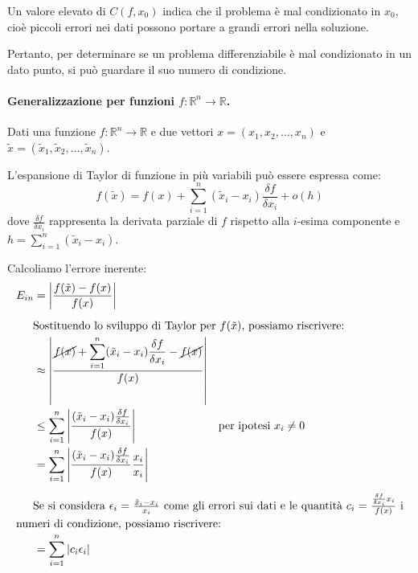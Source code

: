 \documentclass{article}
\numberwithin{equation}{section}
\newcommand{\alignedintertext}[1]{%
  \noalign{%
    \vskip\belowdisplayshortskip
    \vtop{\hsize=\linewidth#1\par
    \expandafter}%
    \expandafter\prevdepth\the\prevdepth
  }%
}
\begin{document}
Un valore elevato di $C(f, x_0)$ indica che il problema è mal condizionato in
$x_0$, cioè piccoli errori nei dati possono portare a grandi errori nella
soluzione.

Pertanto, per determinare se un problema differenziabile è mal condizionato in
un dato punto, si può guardare il suo numero di condizione.

\paragraph{Generalizzazione per funzioni $f:\mathbb{R}^n\rightarrow
\mathbb{R}$.} Dati una funzione $f:\mathbb{R}^n\rightarrow \mathbb{R}$ e due
vettori $x=(x_1,x_2,\ldots,x_n)$ e 
$\tilde{x}=(\tilde{x}_1,\tilde{x}_2,\ldots,\tilde{x}_n)$. 

L'espansione di
Taylor di funzione in più variabili può essere espressa come:
$$f(\tilde{x})=f(x)+\displaystyle\sum_{i=1}^{n}(\tilde{x}_i-x_i)\frac{\delta
f}{\delta x_i}+o(h)$$
dove $\frac{\delta f}{\delta x_i}$ rappresenta la derivata parziale di $f$
rispetto alla $i$-esima componente e
$h=\displaystyle\sum_{i=1}^{n}(\tilde{x}_i-x_i)$.

Calcoliamo l'errore inerente:
\begin{equation*}
   \begin{aligned}
       E_{in}&=\left\lvert \frac{f(\tilde{x})-f(x)}{f(x)}\right\rvert\\
       \alignedintertext{Sostituendo lo sviluppo di Taylor per $f(\tilde{x})$,
       possiamo riscrivere:}
             &\approx \left\lvert
                 \frac{\cancel{f(x)}+\displaystyle\sum_{i=1}^{n}(\tilde{x}_i-x_i)\frac{\delta
             f}{\delta x_i}-\cancel{f(x)}}{f(x)}\right\rvert \\ 
             &\leq \displaystyle\sum_{i=1}^{n}\left\lvert
             \frac{(\tilde{x}_i-x_i)\frac{\delta f}{\delta
x_i}}{f(x)}\right\rvert & \text{per ipotesi } x_i\neq 0\\ 
&= \displaystyle\sum_{i=1}^{n}\left\lvert \frac{(\tilde{x}_i-x_i)\frac{\delta
f}{\delta x_i}}{f(x)}\frac{x_i}{x_i}\right\rvert\\
\alignedintertext{Se si considera $\epsilon_i=\frac{\tilde{x}_i-x_i}{x_i}$
    come gli errori
sui dati e le quantità $c_i=\frac{\frac{\delta f}{\delta x_i}x_i}{f(x)}$ i numeri
di condizione, possiamo riscrivere:}
&= \displaystyle\sum_{i=1}^{n}\left\lvert c_i\epsilon_i\right\rvert
   \end{aligned} 
\end{equation*}
\end{document}
